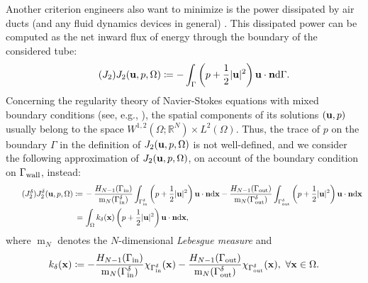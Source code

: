 \documentclass[11pt]{article}
\numberwithin{equation}{section}
\begin{document}
Another criterion engineers also want to minimize is the power dissipated by air ducts (and any fluid dynamics devices in general) \cite{Othmer2008}. This dissipated power can be computed as the net inward flux of energy through the boundary of the considered tube:
\begin{align}
    \label{cost functional: energy dissipation}
    \tag{$J_2$}
    J_2({\bf u},p,\Omega)\coloneqq -\int_\Gamma \left(p + \frac{1}{2}|{\bf u}|^2\right){\bf u}\cdot{\bf n}{\rm d}\Gamma.
\end{align}
Concerning the regularity theory of Navier-Stokes equations with mixed boundary conditions (see, e.g., \cite{Mazya_Rossmann2007, Mazya_Rossmann2009}), the spatial components of its solutions $({\bf u},p)$ usually belong to the space $W^{1,2}(\Omega;\mathbb{R}^N)\times L^2(\Omega)$. Thus, the trace of $p$ on the boundary $\Gamma$ in the definition of $J_2({\bf u},p,\Omega)$ is not well-defined, and we consider the following approximation of $J_2({\bf u},p,\Omega)$, on account of the boundary condition on $\Gamma_{\rm wall}$, instead:
\begin{align}
    \label{cost functional: approximated energy dissipation}
    \tag{$J_2^\delta$}
    J_2^\delta({\bf u},p,\Omega)\coloneqq&\, -\frac{H_{N-1}(\Gamma_{\rm in})}{\operatorname{m}_N(\Gamma_{\rm in}^\delta)}\int_{\Gamma_{\rm in}^\delta} \left(p + \frac{1}{2}|{\bf u}|^2\right){\bf u}\cdot{\bf n}{\rm d}{\bf x} - \frac{H_{N-1}(\Gamma_{\rm out})}{\operatorname{m}_N(\Gamma_{\rm out}^\delta)}\int_{\Gamma_{\rm out}^\delta} \left(p + \frac{1}{2}|{\bf u}|^2\right){\bf u}\cdot{\bf n}{\rm d}{\bf x}\\
    =&\,\int_\Omega k_\delta({\bf x})\left(p + \frac{1}{2}|{\bf u}|^2\right){\bf u}\cdot{\bf n}{\rm d}{\bf x},\nonumber
\end{align}
where $\operatorname{m}_N$ denotes the $N$-dimensional \textit{Lebesgue measure} and
\begin{align*}
    k_\delta({\bf x})\coloneqq -\frac{H_{N-1}(\Gamma_{\rm in})}{\operatorname{m}_N(\Gamma_{\rm in}^\delta)}\chi_{\Gamma_{\rm in}^\delta}({\bf x}) - \frac{H_{N-1}(\Gamma_{\rm out})}{\operatorname{m}_N(\Gamma_{\rm out}^\delta)}\chi_{\Gamma_{\rm out}^\delta}({\bf x}),\ \forall{\bf x}\in\Omega.
\end{align*}
\end{document}
